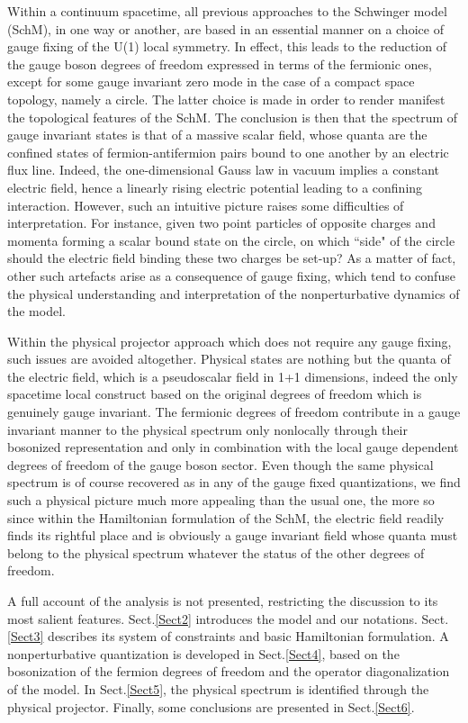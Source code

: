 \documentclass[a4paper,11pt]{article}
\begin{document}
Within a continuum spacetime, all previous 
approaches\cite{Schwinger,SchM1,Manton,Hetrick} to the Schwinger model
(SchM), in one way or another, are based in an essential manner on a choice
of gauge fixing of the U(1) local symmetry. In effect, this leads to the
reduction of the gauge boson degrees of freedom expressed in terms of the
fermionic ones, except for some gauge invariant zero mode in the case of
a compact space topology, namely a circle. The latter choice is 
made\cite{Manton,Hetrick} in order 
to render manifest the topological features of the SchM. The conclusion is
then that the spectrum of gauge invariant states is that of a massive
scalar field, whose quanta are the confined states of
fermion-antifermion pairs bound to one another by an
electric flux line. Indeed, the one-dimensional Gauss law in vacuum 
implies a constant electric field, hence a linearly rising
electric potential leading to a confining interaction. However, such an 
intuitive picture raises some difficulties of interpretation. For instance,
given two point particles of opposite charges and momenta forming a scalar
bound state on the circle, on which ``side" of the circle 
should the electric field binding these two charges be set-up?
As a matter of fact, other such artefacts arise as a consequence of
gauge fixing, which tend to confuse the physical understanding and
interpretation of the nonperturbative dynamics of the model.

Within the physical projector approach which does not require any gauge fixing,
such issues are avoided altogether.\cite{Gov1,Gov4} Physical states are 
nothing but the quanta of the electric field,\cite{Gaby} which is a 
pseudoscalar field in 1+1 dimensions, indeed the only spacetime local construct
based on the original degrees of freedom which is genuinely gauge invariant.
The fermionic degrees of freedom
contribute in a gauge invariant manner to the physical spectrum only nonlocally 
through their bosonized representation and only in combination with the 
local gauge dependent degrees of freedom of the gauge boson sector. Even though
the same physical spectrum is of course recovered as in any of the gauge fixed
quantizations, we find such a physical picture much more appealing than the 
usual one, the more so since within the Hamiltonian formulation of the SchM, 
the electric field readily finds its rightful place and is obviously a gauge 
invariant field whose quanta must belong to the physical spectrum whatever 
the status of the other degrees of freedom.

A full account of the analysis is not presented,\cite{Gaby} restricting the
discussion to its most salient features. Sect.\ref{Sect2} introduces the
model and our notations. Sect.\ref{Sect3} describes its system of constraints
and basic Hamiltonian formulation. A nonperturbative 
quantization is developed in Sect.\ref{Sect4}, based on the bosonization 
of the fermion degrees of freedom and the operator 
dia\-go\-na\-li\-za\-tion of the model. In Sect.\ref{Sect5}, the physical 
spectrum is identified through the physical projector. Finally, some 
conclusions are presented in Sect.\ref{Sect6}.
\end{document}
